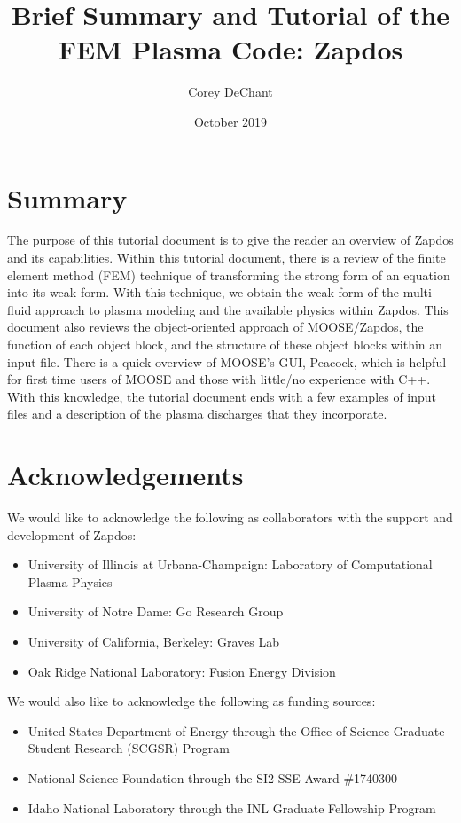 \documentclass[final]{report}
\begin{document}
  \title{Brief Summary and Tutorial of the FEM Plasma Code: Zapdos}
  \date{October 2019}
  \author{Corey DeChant}
  \maketitle

  \chapter*{Summary}
    The purpose of this tutorial document is to give the reader an overview of Zapdos and its capabilities. Within this tutorial document, there is a review of the finite element method (FEM) technique of transforming the strong form of an equation into its weak form. With this technique, we obtain the weak form of the multi-fluid approach to plasma modeling and the available physics within Zapdos. This document also reviews the object-oriented approach of MOOSE/Zapdos, the function of each object block, and the structure of these object blocks within an input file. There is a quick overview of MOOSE's GUI, Peacock, which is helpful for first time users of MOOSE and those with little/no experience with C++. With this knowledge, the tutorial document ends with a few examples of input files and a description of the plasma discharges that they incorporate.

  \chapter*{Acknowledgements}
    We would like to acknowledge the following as collaborators with the support and development of Zapdos:
    \begin{itemize}
        \item University of Illinois at Urbana-Champaign: Laboratory of Computational Plasma Physics
        \item University of Notre Dame: Go Research Group
        \item University of California, Berkeley: Graves Lab
        \item Oak Ridge National Laboratory: Fusion Energy Division
    \end{itemize}
    We would also like to acknowledge the following as funding sources:
    \begin{itemize}
        \item United States Department of Energy through the Office of Science Graduate Student Research (SCGSR) Program
        \item National Science Foundation through the SI2-SSE Award \#1740300
        \item Idaho National Laboratory through the INL Graduate Fellowship Program
    \end{itemize}
\end{document}
